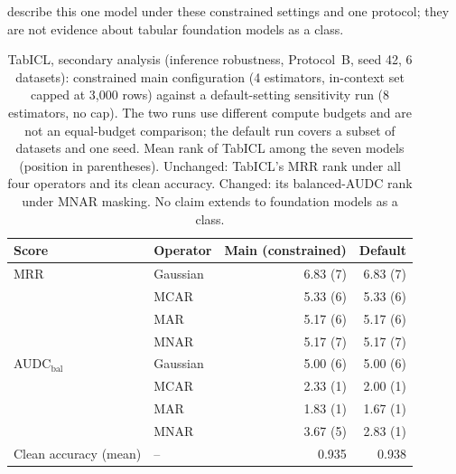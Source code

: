 \documentclass[pdflatex,sn-mathphys]{sn-jnl}
\theoremstyle{thmstyleone}
\theoremstyle{thmstyletwo}
\theoremstyle{thmstylethree}
\begin{document}
describe this one model under these constrained settings and one protocol; they are not evidence about tabular foundation models as a class.

\begin{table}[t]
\centering
\footnotesize
\caption{TabICL, secondary analysis (inference robustness, Protocol~B, seed 42, 6 datasets): constrained main configuration (4 estimators, in-context set capped at 3,000 rows) against a default-setting sensitivity run (8 estimators, no cap). The two runs use different compute budgets and are not an equal-budget comparison; the default run covers a subset of datasets and one seed. Mean rank of TabICL among the seven models (position in parentheses). Unchanged: TabICL's MRR rank under all four operators and its clean accuracy. Changed: its balanced-AUDC rank under MNAR masking. No claim extends to foundation models as a class.}
\label{tab:tabicl_configs}
\begin{tabular}{@{}llrr@{}}
\toprule
Score & Operator & Main (constrained) & Default \\
\midrule
MRR & Gaussian & 6.83 (7) & 6.83 (7) \\
 & MCAR & 5.33 (6) & 5.33 (6) \\
 & MAR & 5.17 (6) & 5.17 (6) \\
 & MNAR & 5.17 (7) & 5.17 (7) \\
\midrule
AUDC$_{\mathrm{bal}}$ & Gaussian & 5.00 (6) & 5.00 (6) \\
 & MCAR & 2.33 (1) & 2.00 (1) \\
 & MAR & 1.83 (1) & 1.67 (1) \\
 & MNAR & 3.67 (5) & 2.83 (1) \\
\midrule
Clean accuracy (mean) & -- & 0.935 & 0.938 \\
\bottomrule
\end{tabular}
\end{table}
\end{document}
